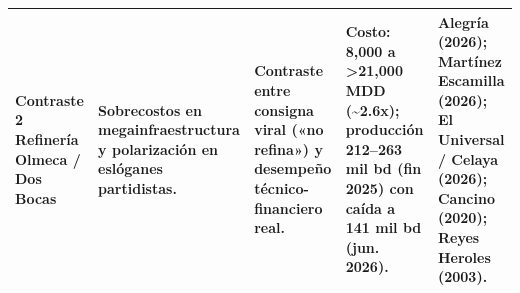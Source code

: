 \begin{landscape}
\begin{table}[H]
\begin{tabular}{@{}p{2cm}p{2.5cm}p{3.5cm}p{4cm}p{6.5cm}@{}}
\addlinespace
Contraste 2 \newline Refinería Olmeca / Dos Bocas & Sobrecostos en megainfraestructura y polarización en eslóganes partidistas. & Contraste entre consigna viral («no refina») y desempeño técnico-financiero real. & Costo: 8,000 a >21,000 MDD (\textasciitilde2.6x); producción 212--263 mil bd (fin 2025) con caída a 141 mil bd (jun. 2026). & Alegría (2026); Martínez Escamilla (2026); El Universal / Celaya (2026); Cancino (2020); Reyes Heroles (2003). \\
\bottomrule
\end{tabular}
\end{table}
\end{landscape}